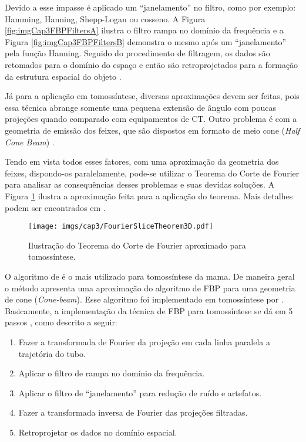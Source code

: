 Devido a esse impasse é aplicado um ``janelamento'' no filtro, como por exemplo: Hamming, Hanning, Shepp-Logan ou cosseno. A Figura \ref{fig:imgCap3FBPFiltersA} ilustra o filtro rampa no domínio da frequência e a Figura \ref{fig:imgCap3FBPFiltersB} demonstra o mesmo após um ``janelamento'' pela função Hanning. Seguido do procedimento de filtragem, os dados são retomados para o domínio do espaço e então são retroprojetados para a formação da estrutura espacial do objeto \cite{xu2014tomographic}. 

Já para a aplicação em tomossíntese, diversas aproximações devem ser feitas, pois essa técnica abrange somente uma pequena extensão de ângulo com poucas projeções quando comparado com equipamentos de \acs{CT}. Outro problema é com a geometria de emissão dos feixes, que são dispostos em formato de meio cone (\textit{Half Cone Beam}) \cite{mertelmeier2014filtered}. 

Tendo em vista todos esses fatores, com uma aproximação da geometria dos feixes, dispondo-os paralelamente, pode-se utilizar o Teorema do Corte de Fourier para analisar as consequências desses problemas e suas devidas soluções. A Figura \ref{fig:imgCap3FourierSliceTheorem3D} ilustra a aproximação feita para a aplicação do teorema. Mais detalhes podem ser encontrados em .

\begin{figure}[H]
	\caption{Ilustração do Teorema do Corte de Fourier aproximado para tomossíntese.}
	\begin{center}
		\texttt{[image: imgs/cap3/FourierSliceTheorem3D.pdf]}
	\end{center}
	\label{fig:imgCap3FourierSliceTheorem3D}
\end{figure} 

O algoritmo de  é o mais utilizado para tomossíntese da mama. De maneira geral o método apresenta uma aproximação do algoritmo de \acs{FBP} para uma geometria de cone (\textit{Cone-beam}). Esse algoritmo foi implementado em tomossíntese por . Basicamente, a implementação da técnica de \acs{FBP} para tomossíntese se dá em 5 passos \cite[p. 16]{xu2014tomographic}, como descrito a seguir:   

\begin{enumerate}
	\item Fazer a transformada de Fourier da projeção em cada linha paralela a trajetória do tubo.
	\item Aplicar o filtro de rampa no domínio da frequência.
	\item Aplicar o filtro de ``janelamento'' para redução de ruído e artefatos.
	\item Fazer a transformada inversa de Fourier das projeções filtradas.
	\item Retroprojetar os dados no domínio espacial.   
\end{enumerate} 

